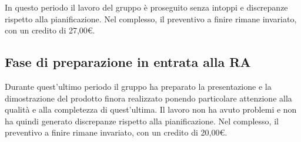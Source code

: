 \documentclass[../piano-di-progetto.tex]{subfiles}
\begin{document}
In questo periodo il lavoro del gruppo è proseguito senza intoppi e discrepanze rispetto alla pianificazione.
Nel complesso, il preventivo a finire rimane invariato, con un credito di 27,00€.

\subsection{Fase di preparazione in entrata alla RA}%
\label{sub:preventivo_a_finire/fase_di_incremento_4}

Durante quest'ultimo periodo il gruppo ha preparato la presentazione e la dimostrazione del prodotto finora realizzato ponendo particolare attenzione alla qualità e alla completezza di quest'ultima.
Il lavoro non ha avuto problemi e non ha quindi generato discrepanze rispetto alla pianificazione.
Nel complesso, il preventivo a finire rimane invariato, con un credito di 20,00€.


\end{document}
